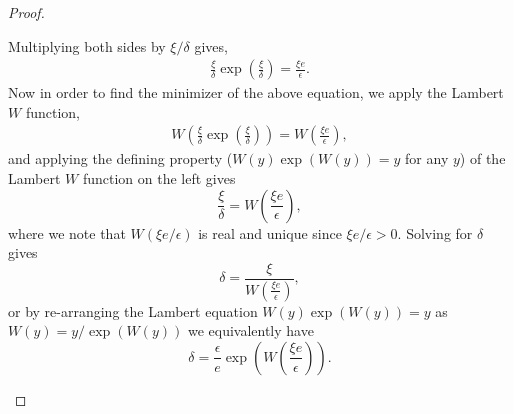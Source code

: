 \documentclass[10pt]{article} %
\begin{document}
\begin{proof}
\begin{itemize}
Multiplying both sides by $\xi/\delta$ gives,
\begin{align*}
 \frac{\xi}{\delta}\exp\left(\frac{\xi}{\delta}\right) = \frac{\xi e}{\epsilon}.
\end{align*}
Now in order to find the minimizer of the above equation, we apply the Lambert $W$ function,
\begin{align*}
 W\left(\frac{\xi}{\delta}\exp\left(\frac{\xi}{\delta}\right)\right) = W\left(\frac{\xi e}{\epsilon}\right),
\end{align*}
and applying the defining property ($W(y)\exp(W(y)) = y$ for any $y$) of the Lambert $W$ function on the left gives
\[
\frac{\xi}{\delta} = W\left(\frac{\xi e}{\epsilon}\right),
\]
where we note that $W(\xi e/\epsilon)$ is real and unique since $\xi e/\epsilon > 0$. Solving for $\delta$ gives
\[
\delta = \frac{\xi}{W(\frac{\xi e}{\epsilon})},
\]
or by re-arranging the Lambert equation $W(y)\exp(W(y)) = y$ as $W(y) = y/\exp(W(y))$ we equivalently have
\[
\delta = \frac{\epsilon}{e}\exp\left(W\left(\frac{\xi e}{\epsilon}\right)\right).
\]
\end{itemize}
\end{proof}
\end{document}
